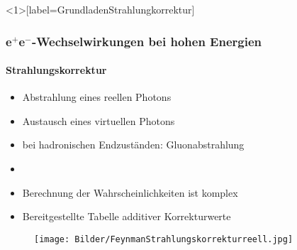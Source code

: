 \documentclass{beamer}
\newcommand{\citeS}[1]{\textsuperscript{\cite{#1}}}
\begin{document}
\begin{frame}<1>[label=GrundladenStrahlungkorrektur]
	\frametitle{e$^+$e$^-$-Wechselwirkungen bei hohen Energien}
	\framesubtitle{Strahlungskorrektur}
	\begin{itemize}
		\item Abstrahlung eines reellen Photons
		\item<2-> Austausch eines virtuellen Photons
		\item<3-> bei hadronischen Endzuständen: Gluonabstrahlung
		\item[]
		\item<4> Berechnung der Wahrscheinlichkeiten ist komplex
		\item<4> Bereitgestellte Tabelle additiver Korrekturwerte
	\end{itemize}
	\begin{figure}
	\centering
	\label{fig:GrundlagenFeynman3}
		\begin{minipage}{0.3\textwidth}
		\texttt{[image: Bilder/FeynmanStrahlungskorrekturreell.jpg]}
		\end{minipage}
	\end{figure}
\end{frame}


\end{document}

